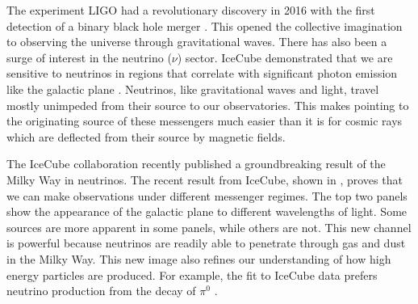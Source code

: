 The experiment LIGO had a revolutionary discovery in 2016 with the first detection of a binary black hole merger \cite{2016:grav_waves}.
This opened the collective imagination to observing the universe through gravitational waves.
There has also been a surge of interest in the neutrino ($\nu$) sector.
IceCube demonstrated that we are sensitive to neutrinos in regions that correlate with significant photon emission like the galactic plane \cite{2023:IC3_galactic_plane}.
Neutrinos, like gravitational waves and light, travel mostly unimpeded from their source to our observatories.
This makes pointing to the originating source of these messengers much easier than it is for cosmic rays which are deflected from their source by magnetic fields.

\begin{figure}[h]
\end{figure}

The IceCube collaboration recently published a groundbreaking result of the Milky Way in neutrinos.
The recent result from IceCube, shown in , proves that we can make observations under different messenger regimes.
The top two panels show the appearance of the galactic plane to different wavelengths of light.
Some sources are more apparent in some panels, while others are not.
This new channel is powerful because neutrinos are readily able to penetrate through gas and dust in the Milky Way.
This new image also refines our understanding of how high energy particles are produced.
For example, the fit to IceCube data prefers neutrino production from the decay of $\pi^0$ \cite{2023:IC3_galactic_plane}.

